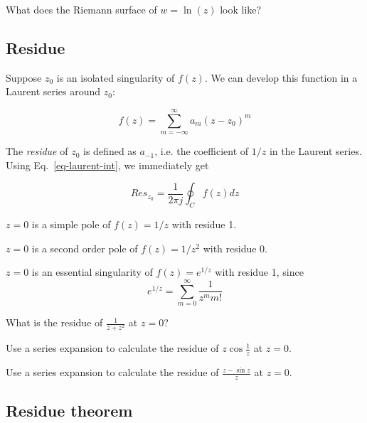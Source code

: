 \begin{exer}
What does the Riemann surface of $w=\ln(z)$ look like?
\end{exer}


\subsection*{Residue}

Suppose $z_0$ is an isolated singularity of $f(z)$. We can develop this function
in a Laurent series around $z_0$:

\begin{equation}
f(z)= \sum_{m=-\infty}^{\infty} a_m (z-z_0)^m
\end{equation} 

The \emph{residue} of $z_0$ is defined as $a_{-1}$, i.e. the coefficient of
$1/z$ in the Laurent series. Using Eq.~\ref{eq-laurent-int}, we immediately get

\begin{equation}
Res_{z_0}=\frac{1}{2 \pi j }  \oint_{{C}} f(z) dz \label{eq-res-int}
\end{equation} 

\begin{cue}
$z=0$ is a simple pole of $f(z)=1/z$ with residue 1.
\end{cue}

\begin{cue}
$z=0$ is a second order pole of $f(z)=1/z^2$ with residue 0.
\end{cue}

\begin{cue}
$z=0$ is an essential singularity of $f(z)=e^{1/z}$ with residue 1, since
$$e^{1/z} = \sum_{m=0}^{\infty} \frac{1}{z^m m!} $$
\end{cue}

\begin{exer}
What is the residue of $\frac{1}{z+z^2}$ at $z=0$?
\end{exer}

\begin{exer}
Use a series expansion to calculate the residue of $z \cos \frac{1}{z}$ at $z=0$.
\end{exer}

\begin{exer}
Use a series expansion to calculate the residue of $\frac{z - \sin z}{z}$ at $z=0$.
\end{exer}


\subsection*{Residue theorem}

